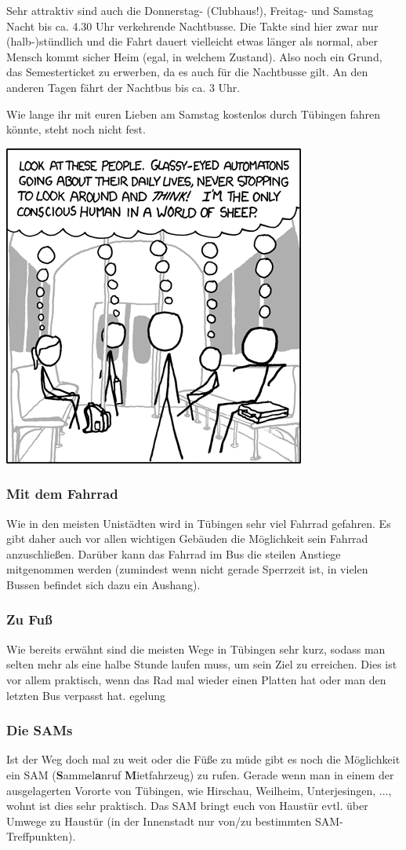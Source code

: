 Sehr attraktiv sind auch die Donnerstag- (Clubhaus!), Freitag- und Samstag Nacht bis ca. 4.30 Uhr verkehrende Nachtbusse.  Die Takte sind hier zwar nur (halb-)stündlich und die Fahrt dauert vielleicht etwas länger als normal, aber Mensch kommt sicher Heim (egal, in welchem Zustand).  Also noch ein Grund, das Semesterticket zu erwerben, da es auch für die Nachtbusse gilt. An den anderen Tagen fährt der Nachtbus bis ca. 3 Uhr.

Wie lange ihr mit euren Lieben am Samstag kostenlos durch Tübingen fahren könnte, steht noch nicht fest.

\begin{center}
\includegraphics[width=0.5\hsize]{info/xkcd/sheeple.png}
\end{center}

\subsubsection*{Mit dem Fahrrad}
Wie in den meisten Unistädten wird in Tübingen sehr viel Fahrrad gefahren. Es gibt daher auch vor allen wichtigen Gebäuden die Möglichkeit sein Fahrrad anzuschließen. Darüber kann das Fahrrad im Bus die steilen Anstiege mitgenommen werden (zumindest wenn nicht gerade Sperrzeit ist, in vielen Bussen befindet sich dazu ein Aushang).

\subsubsection*{Zu Fuß}
Wie bereits erwähnt sind die meisten Wege in Tübingen sehr kurz, sodass man selten mehr als eine halbe Stunde laufen muss, um sein Ziel zu erreichen. Dies ist vor allem praktisch, wenn das Rad mal wieder einen Platten hat oder man den letzten Bus verpasst hat.
egelung
\subsubsection*{Die SAMs}
Ist der Weg doch mal zu weit oder die Füße zu müde gibt es noch die Möglichkeit ein SAM (\textbf{S}ammel\textbf{a}nruf
\textbf{M}ietfahrzeug) zu rufen. Gerade wenn man in einem der ausgelagerten Vororte von Tübingen, wie Hirschau,
Weilheim, Unterjesingen, ..., wohnt ist dies sehr praktisch. Das SAM bringt euch von Haustür evtl. über Umwege zu Haustür (in der Innenstadt nur von/zu bestimmten SAM-Treffpunkten).

